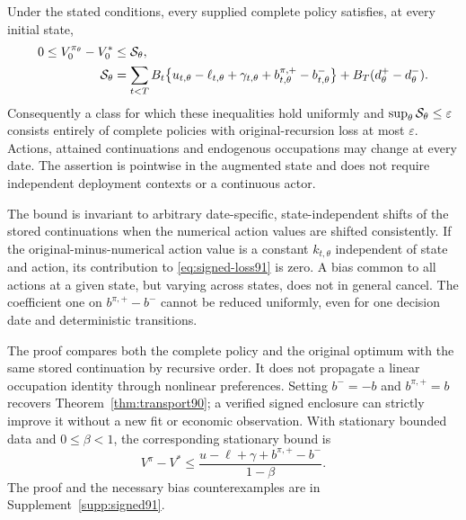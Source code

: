 \begin{theorem}\label{thm:signed91}
Under the stated conditions, every supplied complete policy satisfies, at every initial state,
\begin{align}\label{eq:signed-loss91}
 0\le V_0^{\pi_\theta}-V_0^*
 &\le {\cal S}_\theta,\notag\\
 {\cal S}_\theta
 &=\sum_{t<T}B_t\bigl\{u_{t,\theta}-\ell_{t,\theta}
       +\gamma_{t,\theta}+b^{\pi,+}_{t,\theta}-b^-_{t,\theta}\bigr\}
       +B_T(d^+_\theta-d^-_\theta).
\end{align}
Consequently a class for which these inequalities hold uniformly and $\sup_\theta{\cal S}_\theta\le\varepsilon$ consists entirely of complete policies with original-recursion loss at most $\varepsilon$. Actions, attained continuations and endogenous occupations may change at every date. The assertion is pointwise in the augmented state and does not require independent deployment contexts or a continuous actor.

The bound is invariant to arbitrary date-specific, state-independent shifts of the stored continuations when the numerical action values are shifted consistently. If the original-minus-numerical action value is a constant $k_{t,\theta}$ independent of state and action, its contribution to \eqref{eq:signed-loss91} is zero. A bias common to all actions at a given state, but varying across states, does not in general cancel. The coefficient one on $b^{\pi,+}-b^-$ cannot be reduced uniformly, even for one decision date and deterministic transitions.
\end{theorem}

The proof compares both the complete policy and the original optimum with the same stored continuation by recursive order. It does not propagate a linear occupation identity through nonlinear preferences. Setting $b^-=-b$ and $b^{\pi,+}=b$ recovers Theorem~\ref{thm:transport90}; a verified signed enclosure can strictly improve it without a new fit or economic observation. With stationary bounded data and $0\le\beta<1$, the corresponding stationary bound is
\[
 V^\pi-V^*\le
 \frac{u-\ell+\gamma+b^{\pi,+}-b^-}{1-\beta}.
\]
The proof and the necessary bias counterexamples are in Supplement~\ref{supp:signed91}.

